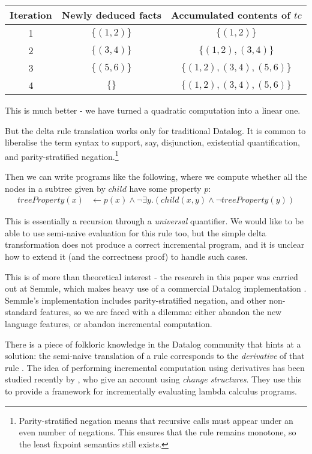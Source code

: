 \begin{center}
  \begin{tabular} {|c|c|c|}
    \hline
    Iteration & Newly deduced facts & Accumulated contents of $tc$ \\
    \hline
    1 & $\{ (1, 2)\}$ & $\{ (1, 2) \}$\\
    2 & $\{ (3,4) \}$ & $\{ (1, 2), (3,4) \}$\\
    3 & $\{ (5,6) \}$ & $\{ (1, 2), (3,4), (5,6) \}$\\
    4 & $\{ \}$ & $\{ (1, 2), (3,4), (5,6) \}$\\
    \hline
  \end{tabular}
\end{center}

This is much better - we have turned a quadratic computation into a linear one.

But the delta rule translation works only for traditional Datalog. It is common to
liberalise the term syntax to support, say, disjunction, existential quantification, and parity-stratified
negation.\footnote{Parity-stratified negation means that recursive calls must
  appear under an even number of negations. This ensures that the rule remains
  monotone, so the least fixpoint semantics still exists.}

Then we can write programs like the following, where we compute whether all the
nodes in a subtree given by $child$ have some property $p$:
\begin{align*}
  treeProperty(x) &\leftarrow p(x) \wedge \neg \exists y . (child(x,y) \wedge \neg treeProperty(y))
\end{align*}

This is essentially a recursion through a \emph{universal} quantifier. We would
like to be able to use semi-naive evaluation for this rule too, but the simple delta
transformation does not produce a correct incremental program, and it is unclear how to extend it (and the
correctness proof) to handle such cases.

This is of more than theoretical interest - the research
in this paper was carried out at Semmle, which
makes heavy use of a commercial Datalog implementation
\autocites{semmleWebsite}{avgustinov2016ql}{sereni2008adding}{schafer2010type}.
Semmle's implementation includes parity-stratified negation, and other non-standard
features, so we are faced with a dilemma: either abandon the new language
features, or abandon incremental computation.

There is a piece of folkloric knowledge in the Datalog community that hints at a
solution: the semi-naive translation of a rule corresponds to the
\emph{derivative} of that rule \autocites{bancilhon1986naive}[section
3.2.2]{bancilhon1986amateur}. The idea of performing incremental computation using derivatives has been
studied recently by \textcite{cai2014changes}, who give an account using
\emph{change structures}. They use this to provide a framework for incrementally evaluating lambda calculus programs.

